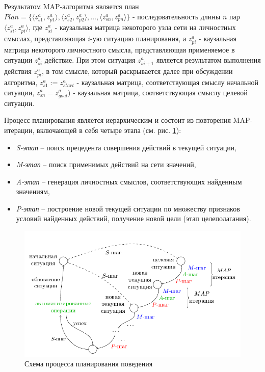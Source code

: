\documentclass[12pt]{report}
\begin{document}
	Результатом MAP-алгоритма является план $Plan=\{\langle z_{s1}^a,z_{p1}^a\rangle, \langle z_{s2}^a,z_{p2}^a\rangle,\dots, \langle z_{sn}^a,z_{pn}^a\rangle\}$ - последовательность длины $n$ пар $\langle z_{si}^a,z_{pi}^a\rangle$, где $z_{si}^a$ - каузальная матрица некоторого узла сети на личностных смыслах, представляющая $i$-ую ситуацию планирования, а $z_{pi}^a$ - каузальная матрица некоторого личностного смысла, представляющая применяемое в ситуации $z_{si}^a$ действие. При этом ситуация $z_{si+1}^a$ является результатом выполнения действия $z_{pi}^a$, в том смысле, который раскрывается далее при обсуждении алгоритма, $z_{s1}^a := z_{start}^a$ - каузальная матрица, соответствующая смыслу начальной ситуации, $z_{sn}^a=z_{goal}^a)$ - каузальная матрица, соответствующая смыслу целевой ситуации.
		
	\begin{algorithm}[H]
		\label{alg:plan}
		\begin{algorithmic}[1]
			
		\end{algorithmic}
	\end{algorithm}
	
	Процесс планирования является иерархическим и состоит из повторения	MAP-итерации, включающей в себя четыре этапа (см. рис. \ref{fig:plan_algo}):
	\begin{itemize}
		\item \textit{S-этап} -- поиск прецедента совершения действий в текущей ситуации,
		\item \textit{M-этап} -- поиск применимых действий на сети значений,
		\item \textit{A-этап} -- генерация личностных смыслов, соответствующих найденным значениям,
		\item \textit{P-этап} -- построение новой текущей ситуации по множеству признаков условий найденных действий, получение новой цели (этап целеполагания).
	\end{itemize}
	
	\begin{figure}
		\centering
		\includegraphics[width=\textwidth]{algo/ru/beh_plan2_ru}
		\caption{Схема процесса планирования поведения}	
		\label{fig:plan_algo}	
	\end{figure}
	
\end{document}

